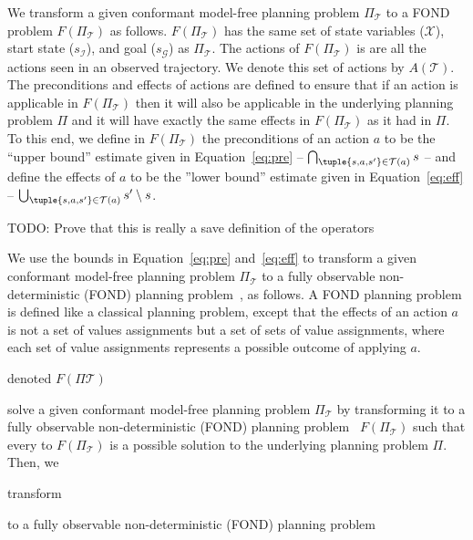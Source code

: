 We transform a given conformant model-free planning problem $\Pi_\mathcal{T}$ to a FOND problem $F(\Pi_\mathcal{T})$ as follows. $F(\Pi_\mathcal{T})$ has the same set of state variables ($\mathcal{X}$), start state ($s_\mathcal{I}$), and goal ($s_\mathcal{G}$) as $\Pi_\mathcal{T}$. The actions of $F(\Pi_\mathcal{T})$ is are all the actions seen in an observed trajectory. We denote this set of actions by $A(\mathcal{T})$. 
The preconditions and effects of actions are defined to ensure that 
if an action is applicable in $F(\Pi_\mathcal{T})$ then it will also be applicable in the underlying planning problem $\Pi$ and it will have exactly the same effects in $F(\Pi_\mathcal{T})$ as it had in $\Pi$. To this end, we define in $F(\Pi_\mathcal{T})$ the preconditions of an action $a$ to be the ``upper bound'' estimate given in Equation~\ref{eq:pre} -- $\bigcap_{\tuple{s, a, s'}\in \mathcal{T}(a)} s$ -- 
and define the effects of $a$ to be the ''lower bound'' estimate given in 
Equation~\ref{eq:eff} -- $\bigcup_{\tuple{s,a,s'}\in\mathcal{T}(a)} s'\setminus s$. 

TODO: Prove that this is really a save definition of the operators



We use the bounds in Equation~\ref{eq:pre} and~\ref{eq:eff} to 
transform a given conformant model-free planning problem $\Pi_\mathcal{T}$ 
to a fully observable non-deterministic (FOND) planning problem~\cite{daniele1999strong,muise2012improved}, 
as follows. 
A FOND planning problem is defined like a classical planning problem, except that the effects of an action $a$
is not a set of values assignments but a set of sets of value assignments, where each set of value assignments represents a possible outcome of applying $a$.  


denoted $F(\Pi\mathcal{T})$

solve a given conformant model-free planning problem $\Pi_\mathcal{T}$ by transforming it to a fully observable non-deterministic (FOND) planning problem~\cite{daniele1999strong,muise2012improved} $F(\Pi_\mathcal{T})$ such that every to $F(\Pi_\mathcal{T})$ 
is a possible solution to the underlying planning problem $\Pi$. Then, we 


transform  





to a fully observable non-deterministic (FOND) planning problem~\cite{daniele1999strong,muise2012improved}

